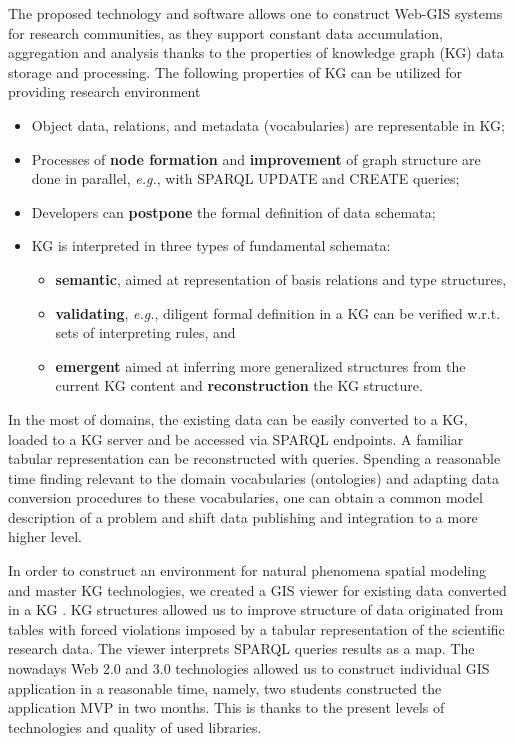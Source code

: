 \documentclass[
]{ceurart}
\begin{document}
The proposed technology and software allows one to construct Web-GIS systems for research communities, as they support constant data accumulation, aggregation and analysis thanks to the properties of knowledge graph (KG) data storage and processing.  The following properties of KG can be utilized for providing research environment
 \begin{itemize}
  \item Object data, relations, and metadata (vocabularies) are representable in KG;
  \item Processes of \textbf{node formation} and \textbf{improvement} of graph structure are done in parallel, \emph{e.g.}, with SPARQL UPDATE and CREATE queries;
  \item Developers can \textbf{postpone} the formal definition of data schemata;
  \item KG is interpreted in three types of fundamental schemata:
    \begin{itemize}
    \item \textbf{semantic}, aimed at representation of basis relations and type structures,
    \item \textbf{validating}, \emph{e.g.}, diligent formal definition in a KG can be verified w.r.t. sets of interpreting rules, and
    \item \textbf{emergent} aimed at inferring more generalized structures from the current KG content and \textbf{reconstruction} the KG structure.
    \end{itemize}
  \end{itemize}

In the most of domains, the existing data can be easily converted to a KG, loaded to a KG server and be accessed via SPARQL endpoints.  A familiar tabular representation can be reconstructed with queries.  Spending a reasonable time finding relevant to the domain vocabularies (ontologies) and adapting data conversion procedures to these vocabularies, one can obtain a common model description of a problem and shift data publishing and integration to a more higher level.

In order to construct an environment for natural phenomena spatial modeling and master KG technologies, we created a GIS viewer for existing data converted in a KG \cite{lunina,afs}.  KG structures allowed us to improve structure of data originated from tables with forced violations imposed by a tabular representation of the scientific research data.  The viewer interprets SPARQL queries results as a map.   The nowadays Web 2.0 and 3.0 technologies allowed us to construct individual GIS application in a reasonable time, namely, two students constructed the application MVP in two months.  This is thanks to the present levels of technologies and quality of used libraries.
\end{document}
